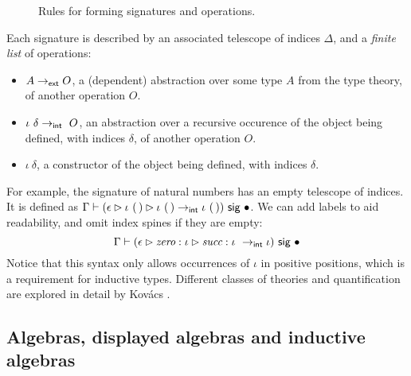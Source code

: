 \begin{figure}[H]
  \caption{Rules for forming signatures and operations.}
\end{figure}

Each signature is described by an associated telescope of indices $\Delta$, and a
\emph{finite list} of operations:
\begin{itemize}
    \item $A \to_{\textsf{ext}} O$, a (dependent) abstraction over some type $A$ from the
      type theory, of another operation $O$.
    \item $\iota\ \delta \to\internal \ O$, an
      abstraction over a recursive occurence of
      the object being defined, with indices $\delta$, of another operation
      $O$.
    \item $\iota\ \delta$, a constructor of the object being defined, with indices $\delta$.
\end{itemize}
For example, the signature of natural numbers has an empty telescope of indices. It is defined as
$\Gamma \vdash (\epsilon \rhd \iota\ (\,) \rhd \iota\ (\,) \to_{\textsf{int}} \iota\ (\,)) \ \textsf{sig}\  \bullet$.
We can add labels to aid readability, and omit index spines if they are empty:
\[
\Gamma \vdash (\epsilon \rhd \textit{zero} : \iota \rhd \textit{succ} : \iota\ \to\internal \iota) \sig \bullet
\]
Notice that this syntax only allows occurrences of $\iota$ in positive
positions, which is a requirement for inductive types.
Different classes of theories and quantification are explored in detail by
Kov\'acs \cite{Kovacs2023-gq}.

\subsection{Algebras, displayed algebras and inductive algebras} \label{sub:algebras}

